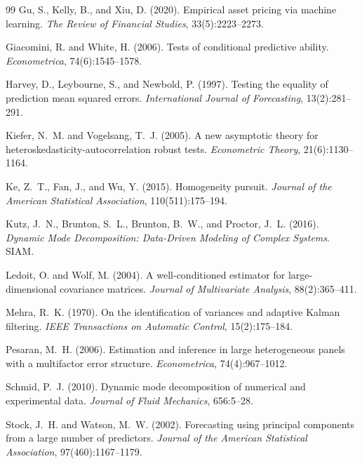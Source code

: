 \documentclass[11pt,a4paper]{article}
\begin{document}
\begin{thebibliography}{99}
Gu, S., Kelly, B., and Xiu, D. (2020).
\newblock Empirical asset pricing via machine learning.
\newblock \emph{The Review of Financial Studies}, 33(5):2223--2273.

Giacomini, R. and White, H. (2006).
\newblock Tests of conditional predictive ability.
\newblock \emph{Econometrica}, 74(6):1545--1578.

Harvey, D., Leybourne, S., and Newbold, P. (1997).
\newblock Testing the equality of prediction mean squared errors.
\newblock \emph{International Journal of Forecasting}, 13(2):281--291.

Kiefer, N.~M. and Vogelsang, T.~J. (2005).
\newblock A new asymptotic theory for heteroskedasticity-autocorrelation robust tests.
\newblock \emph{Econometric Theory}, 21(6):1130--1164.

Ke, Z.~T., Fan, J., and Wu, Y. (2015).
\newblock Homogeneity pursuit.
\newblock \emph{Journal of the American Statistical Association}, 110(511):175--194.

Kutz, J.~N., Brunton, S.~L., Brunton, B.~W., and Proctor, J.~L. (2016).
\newblock \emph{Dynamic Mode Decomposition: Data-Driven Modeling of Complex Systems}.
\newblock SIAM.

Ledoit, O. and Wolf, M. (2004).
\newblock A well-conditioned estimator for large-dimensional covariance matrices.
\newblock \emph{Journal of Multivariate Analysis}, 88(2):365--411.

Mehra, R.~K. (1970).
\newblock On the identification of variances and adaptive Kalman filtering.
\newblock \emph{IEEE Transactions on Automatic Control}, 15(2):175--184.

Pesaran, M.~H. (2006).
\newblock Estimation and inference in large heterogeneous panels with a multifactor error structure.
\newblock \emph{Econometrica}, 74(4):967--1012.

Schmid, P.~J. (2010).
\newblock Dynamic mode decomposition of numerical and experimental data.
\newblock \emph{Journal of Fluid Mechanics}, 656:5--28.

Stock, J.~H. and Watson, M.~W. (2002).
\newblock Forecasting using principal components from a large number of predictors.
\newblock \emph{Journal of the American Statistical Association}, 97(460):1167--1179.


\end{thebibliography}
\end{document}
